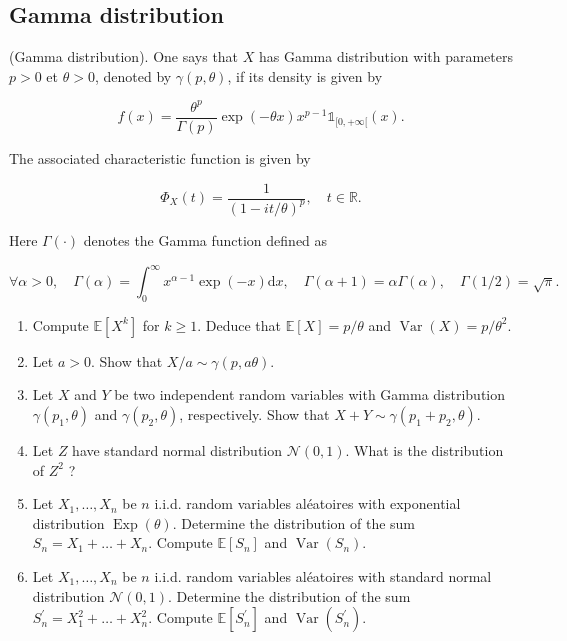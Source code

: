 \begin{center}
    \section*{Gamma distribution}
\end{center}

\begin{Exercise}
    (Gamma distribution). One says that $X$ has Gamma distribution with parameters $p>0$ et $\theta>0$, denoted by $\gamma(p, \theta)$, if its density is given by

$$
f(x)=\frac{\theta^{p}}{\Gamma(p)} \exp (-\theta x) x^{p-1} \mathbb{1}_{[0,+\infty[}(x) .
$$

The associated characteristic function is given by

$$
\Phi_{X}(t)=\frac{1}{(1-i t / \theta)^{p}}, \quad t \in \mathbb{R} .
$$

Here $\Gamma(\cdot)$ denotes the Gamma function defined as

$$
\forall \alpha>0, \quad \Gamma(\alpha)=\int_{0}^{\infty} x^{\alpha-1} \exp (-x) \mathrm{d} x, \quad \Gamma(\alpha+1)=\alpha \Gamma(\alpha), \quad \Gamma(1 / 2)=\sqrt{\pi} .
$$

\begin{enumerate}
  \item Compute $\mathbb{E}\left[X^{k}\right]$ for $k \geq 1$. Deduce that $\mathbb{E}[X]=p / \theta$ and $\operatorname{Var}(X)=p / \theta^{2}$.

  \item Let $a>0$. Show that $X / a \sim \gamma(p, a \theta)$.

  \item Let $X$ and $Y$ be two independent random variables with Gamma distribution $\gamma\left(p_{1}, \theta\right)$ and $\gamma\left(p_{2}, \theta\right)$, respectively. Show that $X+Y \sim \gamma\left(p_{1}+p_{2}, \theta\right)$.

  \item Let $Z$ have standard normal distribution $\mathcal{N}(0,1)$. What is the distribution of $Z^{2}$ ?

  \item Let $X_{1}, \ldots, X_{n}$ be $n$ i.i.d. random variables aléatoires with exponential distribution $\operatorname{Exp}(\theta)$. Determine the distribution of the sum $S_{n}=X_{1}+\ldots+X_{n}$. Compute $\mathbb{E}\left[S_{n}\right]$ and $\operatorname{Var}\left(S_{n}\right)$.

  \item Let $X_{1}, \ldots, X_{n}$ be $n$ i.i.d. random variables aléatoires with standard normal distribution $\mathcal{N}(0,1)$. Determine the distribution of the sum $S_{n}^{\prime}=X_{1}^{2}+\ldots+X_{n}^{2}$. Compute $\mathbb{E}\left[S_{n}^{\prime}\right]$ and $\operatorname{Var}\left(S_{n}^{\prime}\right)$.
\end{enumerate}

\end{Exercise}